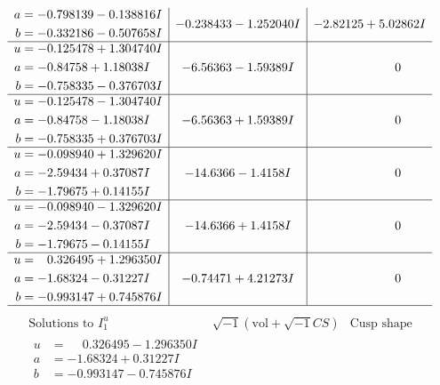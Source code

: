 \documentclass[1p]{elsarticle_modified}
\theoremstyle{definition}
\newcommand{\I}{\sqrt{-1}}
\begin{document}
$$\begin{array}{c|c|c}
\begin{aligned}
a &= -0.798139 - 0.138816 I \\
b &= -0.332186 - 0.507658 I\end{aligned}
 & -0.238433 - 1.252040 I & -2.82125 + 5.02862 I \\ \hline\begin{aligned}
u &= -0.125478 + 1.304740 I \\
a &= -0.84758 + 1.18038 I \\
b &= -0.758335 - 0.376703 I\end{aligned}
 & -6.56363 - 1.59389 I & \phantom{-0.000000 } 0 \\ \hline\begin{aligned}
u &= -0.125478 - 1.304740 I \\
a &= -0.84758 - 1.18038 I \\
b &= -0.758335 + 0.376703 I\end{aligned}
 & -6.56363 + 1.59389 I & \phantom{-0.000000 } 0 \\ \hline\begin{aligned}
u &= -0.098940 + 1.329620 I \\
a &= -2.59434 + 0.37087 I \\
b &= -1.79675 + 0.14155 I\end{aligned}
 & -14.6366 - 1.4158 I & \phantom{-0.000000 } 0 \\ \hline\begin{aligned}
u &= -0.098940 - 1.329620 I \\
a &= -2.59434 - 0.37087 I \\
b &= -1.79675 - 0.14155 I\end{aligned}
 & -14.6366 + 1.4158 I & \phantom{-0.000000 } 0 \\ \hline\begin{aligned}
u &= \phantom{-}0.326495 + 1.296350 I \\
a &= -1.68324 - 0.31227 I \\
b &= -0.993147 + 0.745876 I\end{aligned}
 & -0.74471 + 4.21273 I & \phantom{-0.000000 } 0\\
 \hline 
 \end{array}$$\newpage$$\begin{array}{c|c|c}  
\text{Solutions to }I^u_{1}& \I (\text{vol} + \sqrt{-1}CS) & \text{Cusp shape}\\
 \hline 
\begin{aligned}
u &= \phantom{-}0.326495 - 1.296350 I \\
a &= -1.68324 + 0.31227 I \\
b &= -0.993147 - 0.745876 I\end{aligned}

\end{array}$$
\end{document}
